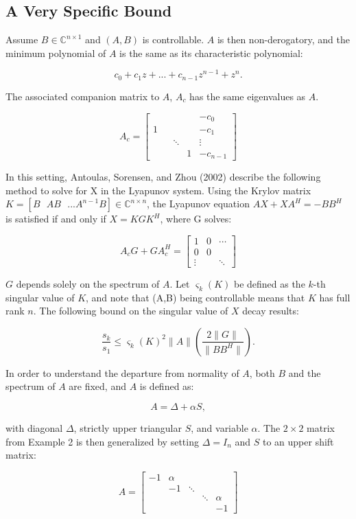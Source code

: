 \documentclass[12pt]{scrartcl}
\newcommand{\Cnn}{\mathbb{C}^{n \times n}}
\begin{document}
\subsection{A Very Specific Bound}

Assume $B \in \mathbb{C}^{n \times 1}$ and $(A,B)$ is controllable. $A$ is then non-derogatory, and the minimum polynomial of $A$ is the same as its characteristic polynomial: 

$$c_{0}+c_{1}z+...+c_{n-1}z^{n-1}+z^{n}.$$

The associated companion matrix to $A$, $A_{c}$ has the same eigenvalues as $A$.

\[
A_{c} =
 \begin{bmatrix}
& & & & -c_{0} \\
1 & & & &-c_{1} \\
& & \ddots & &\vdots \\
& & & 1 & -c_{n-1}
 \end{bmatrix}\] 

In this setting, Antoulas, Sorensen, and Zhou (2002) describe the following method to solve for X in the Lyapunov system. Using the Krylov matrix $K=[B \text{ } AB \text{ }  ... A^{n-1}B] \in \Cnn$, the Lyapunov equation $AX+XA^{H}=-BB^{H}$ is satisfied if and only if $X=KGK^{H}$, where G solves:

\[ A_{c}G+GA_{c}^{H}= \begin{bmatrix}
1 & 0 & \cdots \\
0 & 0 & \\
\vdots & & \ddots \end{bmatrix} \]


$G$ depends solely on the spectrum of $A$. Let $\varsigma_{k}(K)$ be defined as the $k$-th singular value of $K$, and note that (A,B) being controllable means that $K$ has full rank $n$. The following bound on the singular value of $X$ decay results:  

$$\frac{s_{k}}{s_{1}} \leq \varsigma_{k}(K)^{2} \|A\| \left( \frac{2\|G\|}{\|BB^{H}\|} \right).$$

In order to understand the departure from normality of $A$, both $B$ and the spectrum of $A$ are fixed, and $A$ is defined as: 

$$A = \Delta + \alpha S,$$

with diagonal $\Delta$, strictly upper triangular $S$, and variable $\alpha$. The $2 \times 2$ matrix from Example 2 is then generalized by setting $\Delta = I_{n}$ and $S$ to an upper shift matrix:

\[
A =
 \begin{bmatrix}
-1 &  \alpha & & \\
 & -1 & \ddots &  \\
& & & \ddots & \alpha \\
& & &  & -1
 \end{bmatrix}\] 
\end{document}
